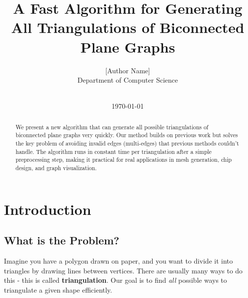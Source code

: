 \documentclass[12pt,a4paper]{article}
\title{A Fast Algorithm for Generating All Triangulations of Biconnected Plane Graphs}
\author{
[Author Name]\\
Department of Computer Science\\
[Institution Name]\\
[Email Address]
}
\date{\today}
\begin{document}
\maketitle

\begin{abstract}
We present a new algorithm that can generate all possible triangulations of biconnected plane graphs very quickly. Our method builds on previous work but solves the key problem of avoiding invalid edges (multi-edges) that previous methods couldn't handle. The algorithm runs in constant time per triangulation after a simple preprocessing step, making it practical for real applications in mesh generation, chip design, and graph visualization.
\end{abstract}

\section{Introduction}

\subsection{What is the Problem?}

Imagine you have a polygon drawn on paper, and you want to divide it into triangles by drawing lines between vertices. There are usually many ways to do this - this is called \textbf{triangulation}. Our goal is to find \emph{all} possible ways to triangulate a given shape efficiently.
\end{document}
